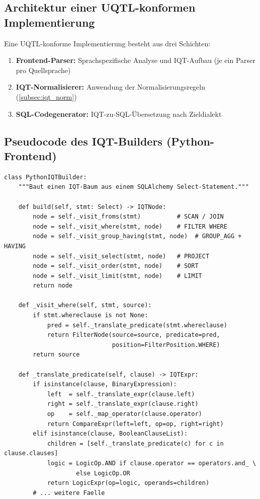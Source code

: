 \subsection{Architektur einer UQTL-konformen Implementierung}
\label{subsec:impl_arch}

Eine UQTL-konforme Implementierung besteht aus drei Schichten:

\begin{enumerate}[leftmargin=1.5cm]
  \item \textbf{Frontend-Parser:} Sprach\-spezifische Analyse und
    IQT-Aufbau (je ein Parser pro Quellsprache)
  \item \textbf{IQT-Normalisierer:} Anwendung der Normalisierungsregeln
    (\ref{subsec:iqt_norm})
  \item \textbf{SQL-Codegenerator:} IQT-zu-SQL-Übersetzung nach Zieldialekt
\end{enumerate}

\subsection{Pseudocode des IQT-Builders (Python-Frontend)}
\label{subsec:impl_py}

\begin{lstlisting}[style=pythonstyle, caption={Python-Frontend: IQT-Builder (vereinfacht)},
  label=lst:impl_py]
class PythonIQTBuilder:
    """Baut einen IQT-Baum aus einem SQLAlchemy Select-Statement."""

    def build(self, stmt: Select) -> IQTNode:
        node = self._visit_froms(stmt)          # SCAN / JOIN
        node = self._visit_where(stmt, node)    # FILTER WHERE
        node = self._visit_group_having(stmt, node)  # GROUP_AGG + HAVING
        node = self._visit_select(stmt, node)   # PROJECT
        node = self._visit_order(stmt, node)    # SORT
        node = self._visit_limit(stmt, node)    # LIMIT
        return node

    def _visit_where(self, stmt, source):
        if stmt.whereclause is not None:
            pred = self._translate_predicate(stmt.whereclause)
            return FilterNode(source=source, predicate=pred,
                              position=FilterPosition.WHERE)
        return source

    def _translate_predicate(self, clause) -> IQTExpr:
        if isinstance(clause, BinaryExpression):
            left  = self._translate_expr(clause.left)
            right = self._translate_expr(clause.right)
            op    = self._map_operator(clause.operator)
            return CompareExpr(left=left, op=op, right=right)
        elif isinstance(clause, BooleanClauseList):
            children = [self._translate_predicate(c) for c in clause.clauses]
            logic = LogicOp.AND if clause.operator == operators.and_ \
                    else LogicOp.OR
            return LogicExpr(op=logic, operands=children)
        # ... weitere Faelle
\end{lstlisting}

